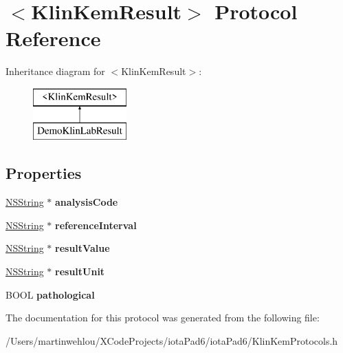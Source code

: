 \hypertarget{protocol_klin_kem_result-p}{
\section{$<$KlinKemResult$>$ Protocol Reference}
\label{protocol_klin_kem_result-p}
}
Inheritance diagram for $<$KlinKemResult$>$:\begin{figure}[H]
\begin{center}
\leavevmode
\includegraphics[height=2.000000cm]{protocol_klin_kem_result-p}
\end{center}
\end{figure}
\subsection*{Properties}
\begin{DoxyCompactItemize}
\item 
\hypertarget{protocol_klin_kem_result-p_af8f8c7f9d64c1afd935c1a567c8961e4}{
\hyperlink{class_n_s_string}{NSString} $\ast$ {\bfseries analysisCode}}
\label{protocol_klin_kem_result-p_af8f8c7f9d64c1afd935c1a567c8961e4}

\item 
\hypertarget{protocol_klin_kem_result-p_a95dd2edbd1bfdf54d70de17f9fecadc2}{
\hyperlink{class_n_s_string}{NSString} $\ast$ {\bfseries referenceInterval}}
\label{protocol_klin_kem_result-p_a95dd2edbd1bfdf54d70de17f9fecadc2}

\item 
\hypertarget{protocol_klin_kem_result-p_a7ea5adb2d6f0bd148fa4c98e3ee4dd0d}{
\hyperlink{class_n_s_string}{NSString} $\ast$ {\bfseries resultValue}}
\label{protocol_klin_kem_result-p_a7ea5adb2d6f0bd148fa4c98e3ee4dd0d}

\item 
\hypertarget{protocol_klin_kem_result-p_ac94f8b3bc287d0110119df64508a974a}{
\hyperlink{class_n_s_string}{NSString} $\ast$ {\bfseries resultUnit}}
\label{protocol_klin_kem_result-p_ac94f8b3bc287d0110119df64508a974a}

\item 
\hypertarget{protocol_klin_kem_result-p_a1abd4efed2c5874e7f3d51301a9344e8}{
BOOL {\bfseries pathological}}
\label{protocol_klin_kem_result-p_a1abd4efed2c5874e7f3d51301a9344e8}

\end{DoxyCompactItemize}


The documentation for this protocol was generated from the following file:\begin{DoxyCompactItemize}
\item 
/Users/martinwehlou/XCodeProjects/iotaPad6/iotaPad6/KlinKemProtocols.h\end{DoxyCompactItemize}
